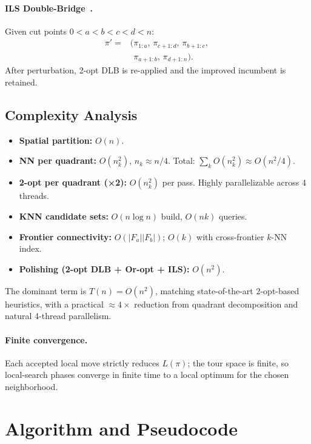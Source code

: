 \documentclass[runningheads]{llncs}
\begin{document}
\paragraph{ILS Double-Bridge~\cite{lourencco2003ils,martin1991large}.}
Given cut points $0<a<b<c<d<n$:
\begin{equation}
\begin{split}
\pi'\!={}&(\pi_{1:a},\,\pi_{c+1:d},\,\pi_{b+1:c},\,\\
         &\phantom{(}\pi_{a+1:b},\,\pi_{d+1:n}).
\end{split}
\end{equation}
After perturbation, 2-opt DLB is re-applied and the improved
incumbent is retained.

\subsection{Complexity Analysis}

\begin{itemize}
  \item \textbf{Spatial partition:} $O(n)$.
  \item \textbf{NN per quadrant:} $O(n_k^2)$, $n_k\approx n/4$.
    Total: $\sum_k O(n_k^2)\approx O(n^2/4)$.
  \item \textbf{2-opt per quadrant (×2):} $O(n_k^2)$ per pass.
    Highly parallelizable across 4 threads.
  \item \textbf{KNN candidate sets:} $O(n\log n)$ build,
    $O(nk)$ queries.
  \item \textbf{Frontier connectivity:} $O(|F_a||F_b|)$;
    $O(k)$ with cross-frontier $k$-NN index.
  \item \textbf{Polishing (2-opt DLB + Or-opt + ILS):} $O(n^2)$.
\end{itemize}

The dominant term is $T(n)=O(n^2)$, matching state-of-the-art
2-opt-based heuristics, with a practical $\approx 4\times$
reduction from quadrant decomposition and natural 4-thread
parallelism.

\paragraph{Finite convergence.}
Each accepted local move strictly reduces $L(\pi)$; the tour space
is finite, so local-search phases converge in finite time to a
local optimum for the chosen neighborhood.

\section{Algorithm and Pseudocode}
\label{sec:algorithm}
\end{document}
